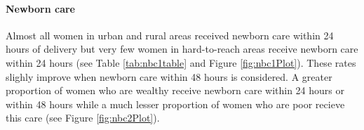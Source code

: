 \documentclass[12pt,a4paper]{article}
\let\oldparagraph\paragraph
\renewcommand{\paragraph}[1]{\oldparagraph{#1}\mbox{}}
\begin{document}
\hypertarget{nbc}{%
\paragraph{Newborn care}\label{nbc}}

Almost all women in urban and rural areas received newborn care within 24 hours of delivery but very few women in hard-to-reach areas receive newborn care within 24 hours (see Table \ref{tab:nbc1table} and Figure \ref{fig:nbc1Plot}). These rates slighly improve when newborn care within 48 hours is considered. A greater proportion of women who are wealthy receive newborn care within 24 hours or within 48 hours while a much lesser proportion of women who are poor recieve this care (see Figure \ref{fig:nbc2Plot}).

\begin{table}[H]


\end{table}
\end{document}
